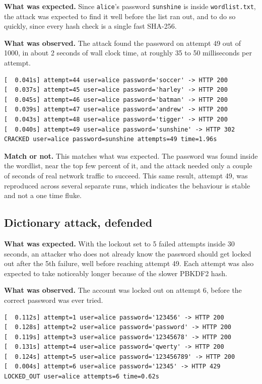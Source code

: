 \documentclass[11pt]{article}
\begin{document}
\textbf{What was expected.} Since \texttt{alice}'s password \texttt{sunshine}
is inside \texttt{wordlist.txt}, the attack was expected to find it well
before the list ran out, and to do so quickly, since every hash check is a
single fast SHA-256.

\textbf{What was observed.} The attack found the password on attempt 49 out
of 1000, in about 2 seconds of wall clock time, at roughly 35 to 50
milliseconds per attempt.

\begin{lstlisting}
[  0.041s] attempt=44 user=alice password='soccer' -> HTTP 200
[  0.037s] attempt=45 user=alice password='harley' -> HTTP 200
[  0.045s] attempt=46 user=alice password='batman' -> HTTP 200
[  0.039s] attempt=47 user=alice password='andrew' -> HTTP 200
[  0.043s] attempt=48 user=alice password='tigger' -> HTTP 200
[  0.040s] attempt=49 user=alice password='sunshine' -> HTTP 302
CRACKED user=alice password=sunshine attempts=49 time=1.96s
\end{lstlisting}

\textbf{Match or not.} This matches what was expected. The password was
found inside the wordlist, near the top few percent of it, and the attack
needed only a couple of seconds of real network traffic to succeed. This
same result, attempt 49, was reproduced across several separate runs,
which indicates the behaviour is stable and not a one time fluke.

\subsection{Dictionary attack, defended}

\textbf{What was expected.} With the lockout set to 5 failed attempts inside
30 seconds, an attacker who does not already know the password should get
locked out after the 5th failure, well before reaching attempt 49. Each
attempt was also expected to take noticeably longer because of the slower
PBKDF2 hash.

\textbf{What was observed.} The account was locked out on attempt 6, before
the correct password was ever tried.

\begin{lstlisting}
[  0.112s] attempt=1 user=alice password='123456' -> HTTP 200
[  0.128s] attempt=2 user=alice password='password' -> HTTP 200
[  0.119s] attempt=3 user=alice password='12345678' -> HTTP 200
[  0.131s] attempt=4 user=alice password='qwerty' -> HTTP 200
[  0.124s] attempt=5 user=alice password='123456789' -> HTTP 200
[  0.004s] attempt=6 user=alice password='12345' -> HTTP 429
LOCKED_OUT user=alice attempts=6 time=0.62s
\end{lstlisting}
\end{document}
